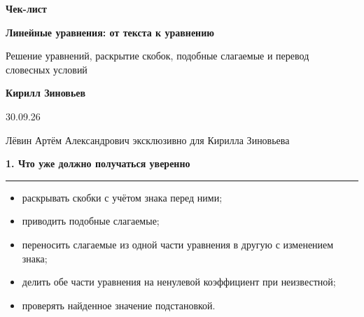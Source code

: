 \documentclass[a4paper,12pt]{article}
\newcommand{\sectiontitle}[1]{%
  \vspace{0.4em}%
  {\Large\bfseries\color{darkaccent}#1}\par
  \vspace{0.35em}%
  {\color{accent}\rule{\linewidth}{0.7pt}}\par
  \vspace{0.5em}%
}
\begin{document}
\thispagestyle{empty}
\begin{center}
  \vspace*{2.6cm}

  {\fontsize{22}{27}\selectfont\bfseries\color{darkaccent} Чек-лист}\par
  \vspace{1.1cm}

  {\fontsize{25}{31}\selectfont\bfseries Линейные уравнения: от текста к уравнению}\par
  \vspace{0.55cm}

  {\large Решение уравнений, раскрытие скобок, подобные слагаемые и перевод\\
  словесных условий}\par

  \vfill

  {\Large\bfseries Кирилл Зиновьев}\par
  \vspace{0.7cm}
  {\large 30.09.26}\par

  \vfill

  {\normalsize Лёвин Артём Александрович эксклюзивно для Кирилла Зиновьева}\par
  \vspace{0.8cm}

\end{center}
\clearpage

\sectiontitle{1. Что уже должно получаться уверенно}

\begin{itemize}
  \item раскрывать скобки с учётом знака перед ними;
  \item приводить подобные слагаемые;
  \item переносить слагаемые из одной части уравнения в другую с изменением знака;
  \item делить обе части уравнения на ненулевой коэффициент при неизвестной;
  \item проверять найденное значение подстановкой.
\end{itemize}
\end{document}
